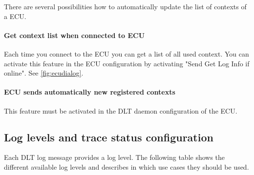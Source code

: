 \documentclass[a4paper,11pt]{article}
\begin{document}
There are several possibilities how to automatically update the list of contexts of a ECU.

\paragraph{Get context list when connected to ECU}

Each time you connect to the ECU you can get a list of all used context.
You can activate this feature in the ECU configuration by activating "Send Get Log Info if
online". See \autoref{fig:ecudialog}.

\paragraph{ECU sends automatically new registered contexts}

This feature must be activated in the DLT daemon configuration of the ECU.

\pagebreak


\subsection{Log levels and trace status configuration}

\label{loglevels}
Each DLT log message provides a log level. The following table shows the different available
log levels and describes in which use cases they should be used.
\end{document}
